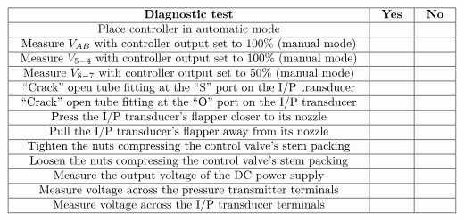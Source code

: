 $$\vbox{\offinterlineskip
\halign{\strut
\vrule \quad\hfil # \ \hfil & 
\vrule \quad\hfil # \ \hfil & 
\vrule \quad\hfil # \ \hfil \vrule \cr
\noalign{\hrule}
%
{\bf Diagnostic test} & {\bf Yes} & {\bf No} \cr
%
\noalign{\hrule}
%
Place controller in automatic mode &  &  \cr
%
\noalign{\hrule}
%
Measure $V_{AB}$ with controller output set to 100\% (manual mode) &  &  \cr
%
\noalign{\hrule}
%
Measure $V_{5-4}$ with controller output set to 100\% (manual mode) &  &  \cr
%
\noalign{\hrule}
%
Measure $V_{8-7}$ with controller output set to 50\% (manual mode) &  &  \cr
%
\noalign{\hrule}
%
``Crack'' open tube fitting at the ``S'' port on the I/P transducer &  &  \cr
%
\noalign{\hrule}
%
``Crack'' open tube fitting at the ``O'' port on the I/P transducer &  &  \cr
%
\noalign{\hrule}
%
Press the I/P transducer's flapper closer to its nozzle &  &  \cr
%
\noalign{\hrule}
%
Pull the I/P transducer's flapper away from its nozzle &  &  \cr
%
\noalign{\hrule}
%
Tighten the nuts compressing the control valve's stem packing &  &  \cr
%
\noalign{\hrule}
%
Loosen the nuts compressing the control valve's stem packing &  &  \cr
%
\noalign{\hrule}
%
Measure the output voltage of the DC power supply &  &  \cr
%
\noalign{\hrule}
%
Measure voltage across the pressure transmitter terminals &  &  \cr
%
\noalign{\hrule}
%
Measure voltage across the I/P transducer terminals &  &  \cr
%
\noalign{\hrule}
} %
}$$ %








